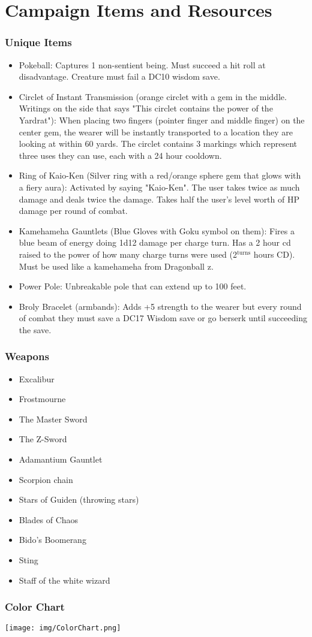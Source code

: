 \chapter{Campaign Items and Resources} \label{resources}



\subsection{Unique Items}

\begin{itemize}
	\item Pokeball: Captures 1 non-sentient being. Must succeed a hit roll at disadvantage. Creature must fail a DC10 wisdom save.
	\item Circlet of Instant Transmission (orange circlet with a gem in the middle. Writings on the side that says "This circlet contains the power of the Yardrat"): When placing two fingers (pointer finger and middle finger) on the center gem, the wearer will be instantly transported to a location they are looking at within 60 yards. The circlet contains 3 markings which represent three uses they can use, each with a 24 hour cooldown.
	\item Ring of Kaio-Ken (Silver ring with a red/orange sphere gem that glows with a fiery aura): Activated by saying "Kaio-Ken". The user takes twice as much damage and deals twice the damage. Takes half the user's level worth of HP damage per round of combat.
	\item Kamehameha Gauntlets (Blue Gloves with Goku symbol on them): Fires a blue beam of energy doing 1d12 damage per charge turn. Has a 2 hour cd raised to the power of how many charge turns were used (2$^\textrm{turns}$ hours CD). Must be used like a kamehameha from Dragonball z.
	\item Power Pole: Unbreakable pole that can extend up to 100 feet.
	\item Broly Bracelet (armbands): Adds +5 strength to the wearer but every round of combat they must save a DC17 Wisdom save or go berserk until succeeding the save. 
\end{itemize}

\subsection{Weapons}

\begin{itemize}
	\item Excalibur
	\item Frostmourne
	\item The Master Sword
	\item The Z-Sword
	\item Adamantium Gauntlet
	\item Scorpion chain
	\item Stars of Guiden (throwing stars)
	\item Blades of Chaos
	\item Bido's Boomerang
	\item Sting
	\item Staff of the white wizard
\end{itemize}

\subsection{Color Chart}

\texttt{[image: img/ColorChart.png]}